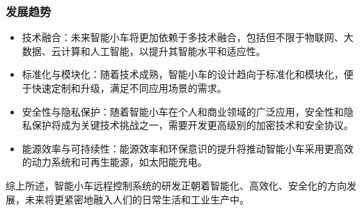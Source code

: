 \subsubsection{发展趋势}
\begin{itemize}
    \item 技术融合：未来智能小车将更加依赖于多技术融合，包括但不限于物联网、大数据、云计算和人工智能，以提升其智能水平和适应性。
    \item 标准化与模块化：随着技术成熟，智能小车的设计趋向于标准化和模块化，便于快速定制和升级，满足不同应用场景的需求。
    \item 安全性与隐私保护：随着智能小车在个人和商业领域的广泛应用，安全性和隐私保护将成为关键技术挑战之一，需要开发更高级别的加密技术和安全协议。
    \item 能源效率与可持续性：能源效率和环保意识的提升将推动智能小车采用更高效的动力系统和可再生能源，如太阳能充电。
\end{itemize}

综上所述，智能小车远程控制系统的研发正朝着智能化、高效化、安全化的方向发展，未来将更紧密地融入人们的日常生活和工业生产中。





